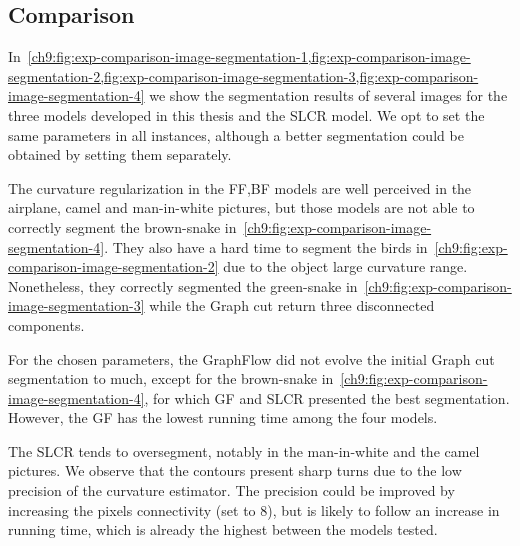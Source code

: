 \subsection{Comparison}

In~\cref{ch9:fig:exp-comparison-image-segmentation-1,fig:exp-comparison-image-segmentation-2,fig:exp-comparison-image-segmentation-3,fig:exp-comparison-image-segmentation-4} we show the segmentation results of several images for the three models developed in this thesis and the SLCR model. We opt to set the same parameters in all instances, although a better segmentation could be obtained by setting them separately.

The curvature regularization in the FF,BF models are well perceived in the airplane, camel and man-in-white pictures, but those models are not able to correctly segment the brown-snake in~\cref{ch9:fig:exp-comparison-image-segmentation-4}. They also have a hard time to segment the birds in~\cref{ch9:fig:exp-comparison-image-segmentation-2} due to the object large curvature range. Nonetheless, they correctly segmented the green-snake in~\cref{ch9:fig:exp-comparison-image-segmentation-3} while the Graph cut return three disconnected components.

For the chosen parameters, the GraphFlow did not evolve the initial Graph cut segmentation to much, except for the brown-snake in~\cref{ch9:fig:exp-comparison-image-segmentation-4}, for which GF and SLCR presented the best segmentation. However, the GF has the lowest running time among the four models.

The SLCR tends to oversegment, notably in the man-in-white and the camel pictures. We observe that the contours present sharp turns due to the low precision of the curvature estimator. The precision could be improved by increasing the pixels connectivity (set to $8$), but is likely to follow an increase in running time, which is already the highest between the models tested.





\newcommand\segComparisonGF[2]{figures/chapter9/segmentation/comparison/#1/#2/alpha-0.0002/beta-1.0/gamma-3.0/radius-7}
\newcommand\segComparisonFF[2]{figures/chapter9/segmentation/comparison/#1/#2/alpha-0.5/beta-1.0/gamma-3.0/radius-7}
\newcommand\segComparisonScho[2]{figures/chapter9/segmentation/comparison/#1/lambda-2.0/gamma-1.0/#2}

